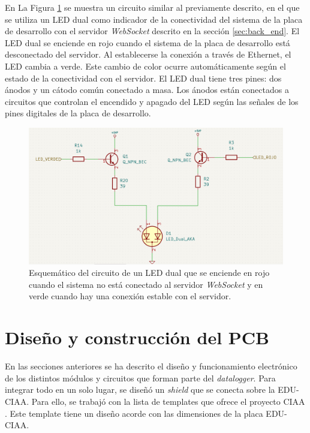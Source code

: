 En La Figura \ref{fig:esquemLedStatusSocket} se muestra un circuito similar al previamente descrito, en el que se utiliza un LED dual como indicador de la conectividad del sistema de la placa de desarrollo con el servidor \textit{WebSocket} descrito en la sección \ref{sec:back_end}. El LED dual se enciende en rojo cuando el sistema de la placa de desarrollo está desconectado del servidor. Al establecerse la conexión a través de Ethernet, el LED cambia a verde. Este cambio de color ocurre automáticamente según el estado de la conectividad con el servidor. El LED dual tiene tres pines: dos ánodos y un cátodo común conectado a masa. Los ánodos están conectados a circuitos que controlan el encendido y apagado del LED según las señales de los pines digitales de la placa de desarrollo.

\begin{figure}[H]
    \centering
    \includegraphics[width=0.95\linewidth]{Figuras/datalogger/Hardware/esquemLedStatusSocket.png}
    \caption{Esquemático del circuito de un LED dual que se enciende en rojo cuando el sistema no está conectado al servidor \textit{WebSocket} y en verde cuando hay una conexión estable con el servidor.}
    \label{fig:esquemLedStatusSocket}
\end{figure}



\section{Diseño y construcción del PCB}

En las secciones anteriores se ha descrito el diseño y funcionamiento electrónico de los distintos módulos y circuitos que forman parte del \textit{datalogger}. Para integrar todo en un solo lugar, se diseñó un \textit{shield} que se conecta sobre la EDU-CIAA. Para ello, se trabajó con la lista de templates que ofrece el proyecto CIAA \cite{CIAA_Ponchos}. Este template tiene un diseño acorde con las dimensiones de la placa EDU-CIAA.

